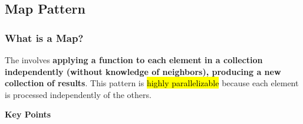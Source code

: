 \subsection{Map Pattern}

\subsubsection{What is a Map?}

The  involves \textbf{applying a function to each element in a collection independently (without knowledge of neighbors), producing a new collection of results}. This pattern is \hl{highly parallelizable} because each element is processed independently of the others.

\highspace
\begin{flushleft}
    \textcolor{Green3}{ \textbf{Key Points}}
\end{flushleft}
